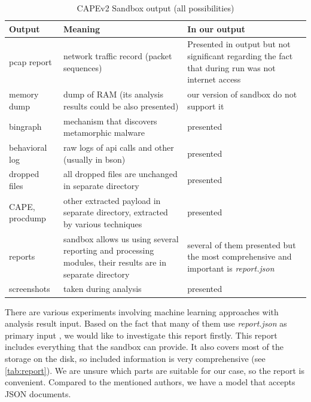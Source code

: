 \begin{table}[h]
  \centering
  \caption{CAPEv2 Sandbox output (all possibilities)}
  \begin{tabular}{p{2cm}p{6cm}p{6cm}} 
      \toprule
      \textbf{Output} &
      \textbf{Meaning} &
      \textbf{In our output} \\
      \midrule
      pcap report & network traffic record (packet sequences) & Presented in output but not significant regarding the fact that during run was not internet access \\
      \midrule
      memory dump & dump of RAM (its analysis results could be also presented)& our version of sandbox do not support it \\
      \midrule
      bingraph & mechanism that discovers metamorphic malware \cite{Kwon2012}& presented\\
      \midrule
      behavioral log & raw logs of api calls and other (usually in bson) & presented \\
      \midrule
      dropped files & all dropped files are unchanged in separate directory & presented \\
      \midrule
      CAPE, procdump & other extracted payload in separate directory, extracted by various techniques \cite{Cape} & presented \\
      \midrule
      reports & sandbox allows us using several reporting and processing modules, their results are in separate directory  & several of them presented but the most comprehensive and important is \emph{report.json} \\
      \midrule
      screenshots & taken during analysis  & presented \\
      \bottomrule
  \end{tabular}
  \label{tab:sandbox-out}
\end{table}


There are various experiments involving machine learning approaches with analysis result input. Based on the fact that many of them use \emph{report.json} as primary input \cite{Darshan2016, Dinh2019a, Kim2020, Sethi2019}, we would like to investigate this report firstly. This report includes everything that the sandbox can provide. It also covers most of the storage on the disk, so included information is very comprehensive (see \ref{tab:report}). We are unsure which parts are suitable for our case, so the report is convenient. Compared to the mentioned authors, we have a model that accepts JSON documents.


